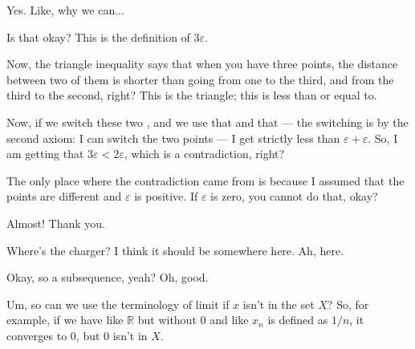 \begin{student}
Yes. Like, why we can...
\end{student}

\begin{speech}[00:17:08 - 00:18:25]
Is that okay? This is the definition of $3\varepsilon$.


Now, the triangle inequality says that when you have three points, the distance between two of them is shorter than going from one to the third, and from the third to the second, right? This is the triangle; this is less than or equal to.

Now, if we switch these two , and we use that and that  --- the switching is by the second axiom: I can switch the two points --- I get strictly less than $\varepsilon + \varepsilon$. So, I am getting that $3\varepsilon < 2\varepsilon$, which is a contradiction, right?


The only place where the contradiction came from is because I assumed that the points are different and $\varepsilon$ is positive. If $\varepsilon$ is zero, you cannot do that, okay?



Almost! Thank you.

 Where's the charger? I think it should be somewhere here. Ah, here.
\end{speech}

\begin{speech}[00:18:25 - 00:18:57]
Okay, so a subsequence, yeah?  Oh, good.
\end{speech}

\begin{student}
Um, so can we use the terminology of limit if $x$ isn't in the set $X$? So, for example, if we have like $\mathbb{R}$ but without $0$ and like $x_n$ is defined as $1/n$, it converges to $0$, but $0$ isn't in $X$.
\end{student}

